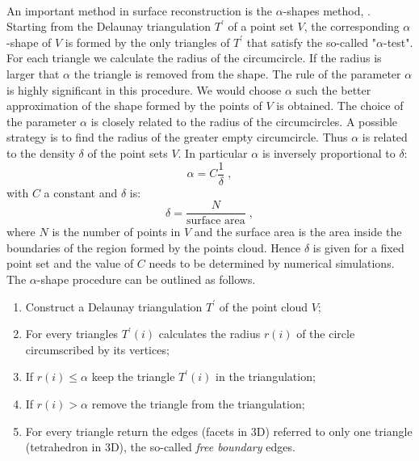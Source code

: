 \\ \indent An important method in surface reconstruction is the $\alpha$-shapes method, \cite{edelsbrunner2010alpha, guo1997surface}. Starting from the Delaunay triangulation $T^\prime$ of a point set $V$, the corresponding $\alpha$-shape of $V$ is formed by the only triangles of $T^\prime$ that satisfy the so-called "$\alpha$-test".
For each triangle we calculate the radius of the circumcircle. If the radius is larger that $\alpha$ the triangle is removed from the shape. The rule of the parameter $\alpha$ is highly significant in this procedure. We would choose $\alpha$ such the better approximation of the shape formed by the points of $V$ is obtained. 
The choice of the parameter $\alpha$ is closely related to the radius of the circumcircles. A possible strategy is to find the radius of the greater empty circumcircle. Thus $\alpha$ is related to the density $\delta$ of the point sets $V$. In particular $\alpha$ is inversely proportional to $\delta$:
\begin{equation}
\alpha=C\frac{1}{\delta}\;,
\end{equation}
with $C$ a constant and $\delta$ is:
\begin{equation}
\delta=\frac{N}{\mbox{surface area}}\; ,
\end{equation}
where $N$ is the number of points in $V$ and the surface area is the area inside the boundaries of the region formed by the points cloud. Hence $\delta$ is given for a fixed point set and the value of $C$ needs to be determined by numerical simulations.\\ \indent 
The $\alpha$-shape procedure can be outlined as follows.
\begin{enumerate}
\item Construct a Delaunay triangulation $T^\prime$ of the point cloud $V$;
\item For every triangles $T^\prime(i)$ calculates the radius $r(i)$ of the circle circumscribed by its vertices;
\item If $r(i)\leq\alpha$ keep the triangle $T^\prime(i)$ in the triangulation;
\item If $r(i)>\alpha$ remove the triangle from the triangulation;
\item For every triangle return the edges (facets in $3$D) referred to only one triangle (tetrahedron in $3$D), the so-called \textit{free boundary} edges.
\end{enumerate}
